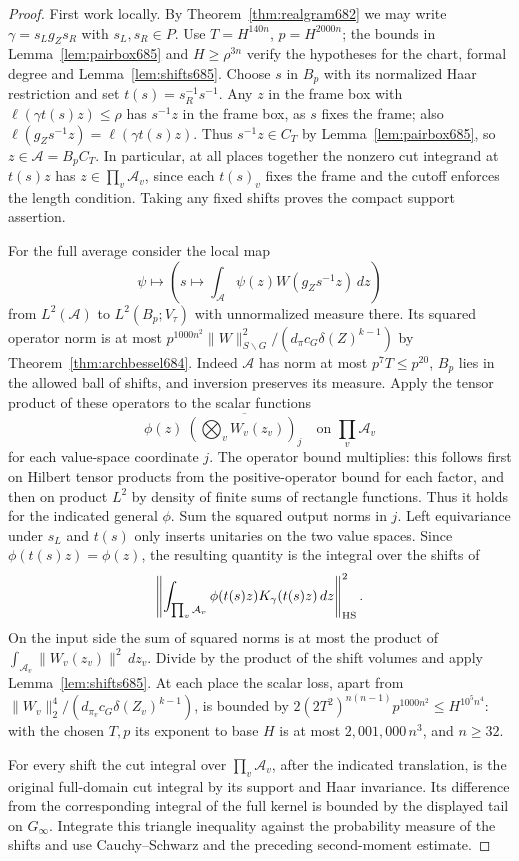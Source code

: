 \documentclass[a4paper,11pt]{article}
\theoremstyle{definition}
\theoremstyle{remark}
\numberwithin{equation}{section}
\begin{document}
\begin{proof}
First work locally. By Theorem~\ref{thm:realgram682} we may
write \(\gamma=s_L g_Z s_R\) with \(s_L,s_R\in P\). Use
\(T=H^{140n}\), \(p=H^{2000n}\); the bounds in
Lemma~\ref{lem:pairbox685} and \(H\ge\rho^{3n}\) verify the
hypotheses for the chart, formal degree and
Lemma~\ref{lem:shifts685}. Choose \(s\) in \(B_p\) with its
normalized Haar restriction and set \(t(s)=s_R^{-1}s^{-1}\).
Any \(z\) in the frame box with \(\ell(\gamma t(s)z)\le\rho\)
has \(s^{-1}z\) in the frame box, as \(s\) fixes the frame;
also \(\ell(g_Zs^{-1}z)=\ell(\gamma t(s)z)\). Thus
\(s^{-1}z\in C_T\) by Lemma~\ref{lem:pairbox685}, so
\(z\in\mathcal A=B_p C_T\). In particular, at all places
together the nonzero cut integrand at \(t(s)z\) has
\(z\in\prod_v\mathcal A_v\), since each \(t(s)_v\) fixes the
frame and the cutoff enforces the length condition.
Taking any fixed shifts proves the compact support assertion.

For the full average consider the local map
\[
   \psi\longmapsto
       \left(s\longmapsto\int_{\mathcal A}
                              \psi(z)W(g_Zs^{-1}z)\,dz\right)
\]
from \(L^2(\mathcal A)\) to \(L^2(B_p;V_\tau)\) with unnormalized
measure there. Its squared operator norm is at most
\(p^{1000n^2}\|W\|_{S\backslash G}^2/
(d_\pi c_G\delta(Z)^{k-1})\) by
Theorem~\ref{thm:archbessel684}. Indeed \(\mathcal A\) has
norm at most \(p^7 T\le p^{20}\), \(B_p\) lies in the allowed
ball of shifts, and inversion preserves its measure. Apply
the tensor product of these operators to the scalar functions
\[
       \phi(z)\ \overline{\left(\bigotimes_v W_v(z_v)\right)_j}
               \quad\text{on }\prod_v\mathcal A_v
\]
for each value-space coordinate \(j\). The operator bound
multiplies: this follows first on Hilbert tensor products
from the positive-operator bound for each factor, and then
on product \(L^2\) by density of finite sums of rectangle
functions. Thus it holds for the indicated general \(\phi\).
Sum the squared output norms in \(j\). Left equivariance
under \(s_L\) and \(t(s)\) only inserts unitaries on the two
value spaces. Since \(\phi(t(s)z)=\phi(z)\), the resulting
quantity is the integral over the shifts of
\[
 \left\|\int_{\prod_v\mathcal A_v}
          \phi(t(s)z)K_\gamma(t(s)z)\,dz\right\|_{\rm HS}^2 .
\]
On the input side the sum of squared norms is at most the
product of \(\int_{\mathcal A_v}\|W_v(z_v)\|^2\,dz_v\).
Divide by the product of the shift volumes and apply
Lemma~\ref{lem:shifts685}. At each place the scalar loss,
apart from \(\|W_v\|_2^4/(d_{\pi_v}c_G\delta(Z_v)^{k-1})\),
is bounded by
\(2(2T^2)^{n(n-1)}p^{1000n^2}\le H^{10^5n^4}\):
with the chosen \(T,p\) its exponent to base \(H\) is at most
\(2{,}001{,}000\,n^3\), and \(n\ge32\).

For every shift the cut integral over \(\prod_v\mathcal A_v\),
after the indicated translation, is the original full-domain
cut integral by its support and Haar invariance. Its difference
from the corresponding integral of the full kernel is bounded
by the displayed tail on \(G_\infty\). Integrate this triangle
inequality against the probability measure of the shifts and
use Cauchy--Schwarz and the preceding second-moment estimate.
\end{proof}
\end{document}
